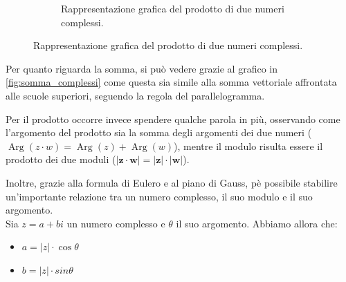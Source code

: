 \documentclass[12pt]{report}
\begin{document}
\begin{figure}[h!]
\begin{subfigure}[b]{0.45\textwidth}
				
				\caption{Rappresentazione grafica del prodotto di due numeri complessi.}
				\label{fig:prodotto_complessi}
				
			\end{subfigure}
		
	\end{figure}
	
	Per quanto riguarda la somma, si può vedere grazie al grafico in \ref{fig:somma_complessi} come questa sia simile alla somma vettoriale affrontata alle scuole superiori, seguendo la regola del parallelogramma.
	
	\newpage
	Per il prodotto occorre invece spendere qualche parola in più, osservando come l'argomento del prodotto sia la somma degli argomenti dei due numeri ($\operatorname{Arg}(z \cdot w) = \operatorname{Arg}(z) + \operatorname{Arg}(w)$), mentre il modulo risulta essere il prodotto dei due moduli ($\mathbf{\left|z \cdot w\right| = \left|z\right| \cdot \left|w\right|}$).
	
	Inoltre, grazie alla formula di Eulero e al piano di Gauss, pè possibile stabilire un'importante relazione tra un numero complesso, il suo modulo e il suo argomento.\\
	Sia $z = a + bi$ un numero complesso e $\theta$ il suo argomento. Abbiamo allora che:
	\begin{itemize}
		\item $a = \left|z\right| \cdot \cos{\theta}$
		\item $b = \left|z\right| \cdot sin{\theta}$
	\end{itemize}
	
\end{document}
